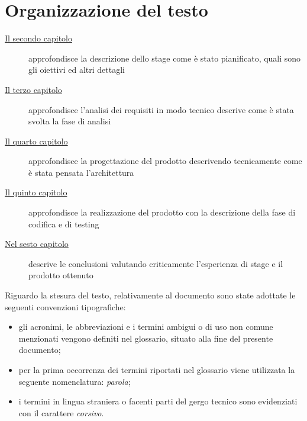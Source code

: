 \section{Organizzazione del testo}

\begin{description}
  \item[{\hyperref[cap:descrizione-stage]{Il secondo capitolo}}] approfondisce la descrizione dello stage come è stato pianificato, quali sono gli oiettivi ed altri dettagli

  \item[{\hyperref[cap:analisi-requisiti]{Il terzo capitolo}}] approfondisce l'analisi dei requisiti in modo tecnico descrive come è stata svolta la fase di analisi

  \item[{\hyperref[cap:progettazione]{Il quarto capitolo}}] approfondisce la progettazione del prodotto descrivendo tecnicamente come è stata pensata l'architettura

  \item[{\hyperref[cap:realizzazione]{Il quinto capitolo}}] approfondisce la realizzazione del prodotto con la descrizione della fase di codifica e di testing

  \item[{\hyperref[cap:conclusioni]{Nel sesto capitolo}}] descrive le conclusioni valutando criticamente l'esperienza di stage e il prodotto ottenuto
\end{description}

Riguardo la stesura del testo, relativamente al documento sono state adottate le seguenti convenzioni tipografiche:
\begin{itemize}
  \item gli acronimi, le abbreviazioni e i termini ambigui o di uso non comune menzionati vengono definiti nel glossario, situato alla fine del presente documento;
  \item per la prima occorrenza dei termini riportati nel glossario viene utilizzata la seguente nomenclatura: \emph{parola}\glsfirstoccur;
  \item i termini in lingua straniera o facenti parti del gergo tecnico sono evidenziati con il carattere \emph{corsivo}.
\end{itemize}

